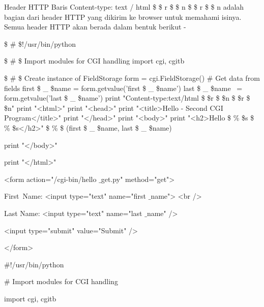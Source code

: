 \begin{12pt}
\begin{12pt}
\begin{12pt}
\begin{12pt}
\begin{12pt}
\begin{12pt}
\begin{12pt}
Header HTTP 
\vspace{12pt}
\noindent 
Baris Content-type: text / html  \$  \setminus  \$ r  \$  \setminus  \$ n  \$  \setminus  \$ r  \$  \setminus  \$ n adalah bagian dari header HTTP yang dikirim ke browser untuk memahami isinya. Semua header HTTP akan berada dalam bentuk berikut - \par
\noindent 
 \$  \#  \$!/usr/bin/python \par
\vspace{12pt}
\noindent 
 \$  \#  \$ Import modules for CGI handling  
\noindent 
import cgi, cgitb  \par
\vspace{12pt}
\noindent 
 \$  \#  \$ Create instance of FieldStorage 
\noindent 
form = cgi.FieldStorage()  
\vspace{12pt}
\noindent 
   \#   Get data from fields 
\noindent 
first \$  \_  \$name = form.getvalue('first \$  \_  \$name') 
\noindent 
last \$  \_  \$name~ = form.getvalue('last \$  \_  \$name') 
\vspace{12pt}
\noindent 
print "Content-type:text/html \$  \setminus  \$r \$  \setminus  \$n \$  \setminus  \$r \$  \setminus  \$n" 
\noindent 
print "<html>" 
\noindent 
print "<head>" 
\noindent 
print "<title>Hello - Second CGI Program</title>" 
\noindent 
print "</head>" 
\noindent 
print "<body>" 
\noindent 
print "<h2>Hello  \$  \%  \$s  \$  \%  \$s</h2>"  \$  \%  \$ (first \$  \_  \$name, last \$  \_  \$name) \par
\noindent 
print "</body>" \par
\noindent 
print "</html>" \par
\vspace{12pt}
\noindent 
<form action="/cgi-bin/hello $  \_  $get.py" method="get"> \par
\noindent 
First~Name: <input type="text" name="first $  \_  $name">  <br /> \par
\vspace{12pt}
\noindent 
Last Name: <input type="text" name="last $  \_  $name" /> \par
\noindent 
<input type="submit" value="Submit" /> \par
\noindent 
</form> \par
\vspace{12pt}
\noindent 
 $  \#  $!/usr/bin/python \par
\vspace{12pt}
\noindent 
 $  \#  $ Import modules for CGI handling  \par
\noindent 
import cgi, cgitb  \par

\end{12pt}
\end{12pt}
\end{12pt}
\end{12pt}
\end{12pt}
\end{12pt}
\end{12pt}
